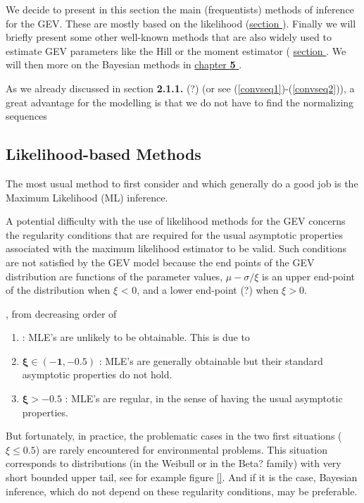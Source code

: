 \documentclass[11pt,a4paper,openany ]{book}
\begin{document}
We decide to present in this section the main (frequentists) methods of inference for the GEV. These are mostly based on the likelihood (\hyperref[likintro]{section }). Finally we will briefly present some other well-known methods that are also widely used to estimate GEV parameters like the Hill or the moment estimator ( \hyperref[gev:other]{section }. We will then more on the Bayesian methods in \hyperref[sec:bayesian]{chapter \textbf{5} }.
 
As we already discussed in section \textbf{2.1.1.} (?) (or see (\ref{convseq1})-(\ref{convseq2})), a great advantage for the modelling is that we do not have to find the normalizing sequences



\subsection{Likelihood-based Methods}\label{likintro}

The most usual method to first consider and which generally do a good job is the Maximum Likelihood (ML) inference.

A potential difficulty with the use of likelihood methods for the GEV concerns the regularity conditions that are required for the usual asymptotic properties associated with the
maximum likelihood estimator to be valid. Such conditions are not satisfied by the GEV
model because the end points of the GEV distribution are functions of the parameter values,
$\mu-\sigma/\xi$ is an upper end-point of the distribution when $\xi$ < 0, and a lower end-point (?) when
$\xi > 0$. \citet{saeb_general_2014}


, from decreasing order of 
\citet[pp.55]{coles_introduction_2001}

\begin{enumerate}
	\item\label{it1lik}  : MLE's are unlikely to be obtainable. This is due to 
	\item $\boldsymbol{\xi\in(-1,-0.5)}$ : MLE's are generally obtainable but their standard asymptotic properties do not hold.
	\item $\boldsymbol{\xi>-0.5}$ : MLE's are regular, in the sense of having the usual asymptotic properties.
\end{enumerate}


But fortunately, in practice, the problematic cases in the two first situations ($\xi\leq 0.5$) are rarely encountered for environmental problems. This situation corresponds to distributions (in the Weibull or in the Beta? family) with very short bounded upper tail, see for example figure \ref{}.
And if it is the case, Bayesian inference, which do not depend on these regularity conditions, may be preferable.
\end{document}
